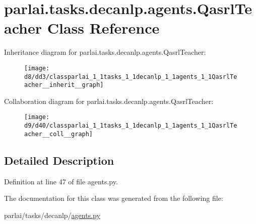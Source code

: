 \hypertarget{classparlai_1_1tasks_1_1decanlp_1_1agents_1_1QasrlTeacher}{}\section{parlai.\+tasks.\+decanlp.\+agents.\+Qasrl\+Teacher Class Reference}
\label{classparlai_1_1tasks_1_1decanlp_1_1agents_1_1QasrlTeacher}


Inheritance diagram for parlai.\+tasks.\+decanlp.\+agents.\+Qasrl\+Teacher\+:
\nopagebreak
\begin{figure}[H]
\begin{center}
\leavevmode
\texttt{[image: d8/dd3/classparlai\_1\_1tasks\_1\_1decanlp\_1\_1agents\_1\_1QasrlTeacher\_\_inherit\_\_graph]}
\end{center}
\end{figure}


Collaboration diagram for parlai.\+tasks.\+decanlp.\+agents.\+Qasrl\+Teacher\+:
\nopagebreak
\begin{figure}[H]
\begin{center}
\leavevmode
\texttt{[image: d9/d40/classparlai\_1\_1tasks\_1\_1decanlp\_1\_1agents\_1\_1QasrlTeacher\_\_coll\_\_graph]}
\end{center}
\end{figure}


\subsection{Detailed Description}


Definition at line 47 of file agents.\+py.



The documentation for this class was generated from the following file\+:\begin{DoxyCompactItemize}
\item 
parlai/tasks/decanlp/\hyperlink{parlai_2tasks_2decanlp_2agents_8py}{agents.\+py}\end{DoxyCompactItemize}
